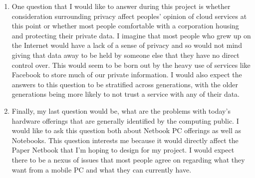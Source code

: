 \documentclass[12pt,oneside,letterpaper]{article}
\begin{document}
\begin{enumerate}
\item One question that I would like to answer during this project is whether
  consideration surrounding privacy affect peoples' opinion of cloud services at
  this point or whether most people comfortable with a corporation housing and
  protecting their private data.  I imagine that most people who grew up on the
  Internet would have a lack of a sense of privacy and so would not mind giving
  that data away to be held by someone else that they have no direct control
  over.  This would seem to be born out by the heavy use of services like
  Facebook to store much of our private information.  I would also expect the
  answers to this question to be stratified across generations, with the older
  generations being more likely to not trust a service with any of their data.

\item Finally, my last question would be, what are the problems with today's
  hardware offerings that are generally identified by the computing public.  I
  would like to ask this question both about Netbook PC offerings as well as
  Notebooks.  This question interests me because it would directly affect the
  Paper Netbook that I'm hoping to design for my project.  I would expect there
  to be a nexus of issues that most people agree on regarding what they want
  from a mobile PC and what they can currently have.

\end{enumerate}
\end{document}
